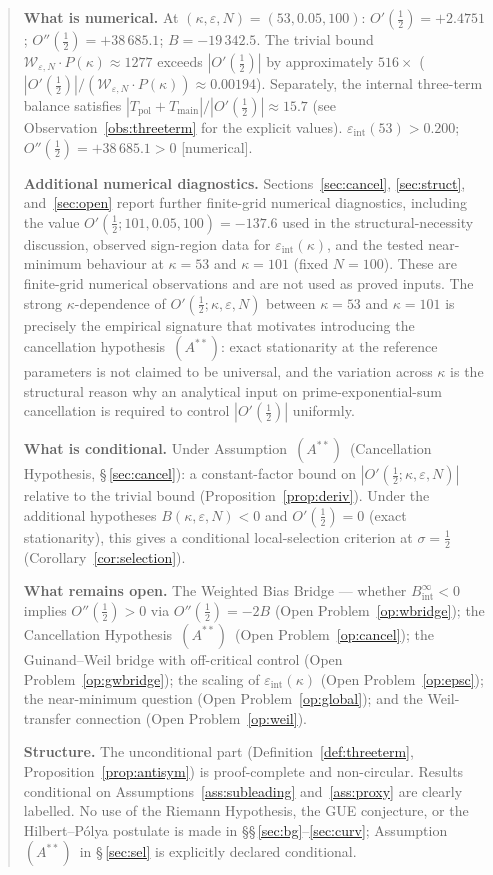 \documentclass[11pt]{article}
\newcommand{\Astar}{\ensuremath{(A^{**})}}  %
\begin{document}
\begin{abstract}
\textbf{What is numerical.}
At $(\kappa,\varepsilon,N)=(53,0.05,100)$:
$O'(\tfrac12)=+2.4751$; $O''(\tfrac12)=+38\,685.1$; $B=-19\,342.5$.
The trivial bound $\mathcal{W}_{\varepsilon,N}\cdot P(\kappa)\approx 1277$
exceeds $|O'(\tfrac12)|$ by approximately $516\times$
($|O'(\tfrac12)|/(\mathcal{W}_{\varepsilon,N}\cdot P(\kappa))\approx 0.00194$).
Separately, the internal three-term balance satisfies
$|T_{\mathrm{pol}}+T_{\mathrm{main}}|/|O'(\tfrac12)|\approx 15.7$
(see Observation~\ref{obs:threeterm} for the explicit values).
$\varepsilon_{\mathrm{int}}(53)>0.200$; $O''(\tfrac12)=+38\,685.1>0$ [numerical].

\textbf{Additional numerical diagnostics.}
Sections~\ref{sec:cancel}, \ref{sec:struct}, and~\ref{sec:open}
report further finite-grid numerical diagnostics, including the value
$O'(\tfrac12;101,0.05,100)=-137.6$ used in the structural-necessity
discussion, observed sign-region data for
$\varepsilon_{\mathrm{int}}(\kappa)$, and the tested near-minimum
behaviour at $\kappa=53$ and $\kappa=101$ (fixed $N=100$).
These are finite-grid numerical observations and are not used as
proved inputs.
The strong $\kappa$-dependence of $O'(\tfrac12;\kappa,\varepsilon,N)$
between $\kappa=53$ and $\kappa=101$ is precisely the empirical signature
that motivates introducing the cancellation hypothesis~\Astar:
exact stationarity at the reference parameters is not claimed to be
universal, and the variation across $\kappa$ is the structural reason
why an analytical input on prime-exponential-sum cancellation is
required to control $|O'(\tfrac12)|$ uniformly.

\textbf{What is conditional.}
Under Assumption~\Astar\ (Cancellation Hypothesis, \S\,\ref{sec:cancel}):
a constant-factor bound on $|O'(\tfrac12;\kappa,\varepsilon,N)|$ relative
to the trivial bound (Proposition~\ref{prop:deriv}).
Under the additional hypotheses $B(\kappa,\varepsilon,N)<0$ and
$O'(\tfrac12)=0$ (exact stationarity), this gives a conditional
local-selection criterion at $\sigma=\tfrac12$
(Corollary~\ref{cor:selection}).

\textbf{What remains open.}
The Weighted Bias Bridge --- whether $B_{\mathrm{int}}^\infty<0$ implies
$O''(\tfrac12)>0$ via $O''(\tfrac12)=-2B$ (Open Problem~\ref{op:wbridge});
the Cancellation Hypothesis~\Astar\ (Open Problem~\ref{op:cancel});
the Guinand--Weil bridge with off-critical control
(Open Problem~\ref{op:gwbridge}); the scaling of $\varepsilon_{\mathrm{int}}(\kappa)$
(Open Problem~\ref{op:epsc}); the near-minimum question
(Open Problem~\ref{op:global}); and the Weil-transfer connection
(Open Problem~\ref{op:weil}).

\textbf{Structure.}
The unconditional part (Definition~\ref{def:threeterm}, Proposition~\ref{prop:antisym})
is proof-complete and non-circular.
Results conditional on Assumptions~\ref{ass:subleading}
and~\ref{ass:proxy} are clearly labelled.
No use of the Riemann Hypothesis, the GUE conjecture, or the
Hilbert--P\'olya postulate is made in \S\S\,\ref{sec:bg}--\ref{sec:curv};
Assumption~\Astar\ in \S\,\ref{sec:sel} is explicitly declared conditional.
\end{abstract}
\end{document}
